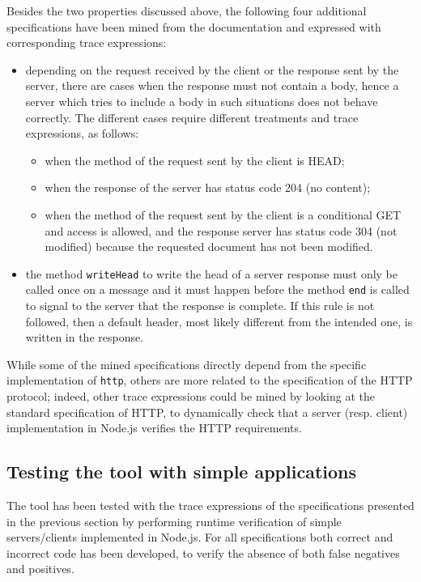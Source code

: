 Besides the two properties discussed above, the following four additional specifications have been mined from
the documentation and expressed with corresponding trace expressions:
\begin{itemize}
\item depending on the request received by the client or the response sent by the server, there are cases when the response must not
  contain a body, hence
  a server which tries to include a body in such situations does not behave correctly. The different cases require
  different treatments and trace expressions, as follows:
  \begin{itemize}
  \item when the method of the request sent by the client is HEAD;
  \item when the response of the server has status code 204 (no content);
  \item when the method of the request sent by the client is a conditional GET and access is allowed, and the response
    server has status code 304 (not modified) because the requested document has not been modified.
  \end{itemize}
\item the method \lstinline{writeHead} to write the head of a server response must only be called once on a message and it must happen before
  the method \lstinline{end} is called to signal to the server that the response is complete. If this rule is not followed, then
  a default header, most likely different from the intended one, is written in the response.
\end{itemize}
While some of the mined specifications directly depend from the specific implementation of \lstinline{http}, others
are more related to the specification of the HTTP protocol; indeed, other trace expressions could be mined by looking at the
standard specification of HTTP, to dynamically check that a server (resp. client) implementation in Node.js verifies the HTTP
requirements.

\subsection{Testing the tool with simple applications}
\label{sec:simple-test}
The tool has been tested with the trace expressions of the specifications presented in the previous section by performing
runtime verification of simple servers/clients implemented in Node.js.
For all specifications both correct and incorrect code has been developed, to verify the absence of both false negatives and positives.

